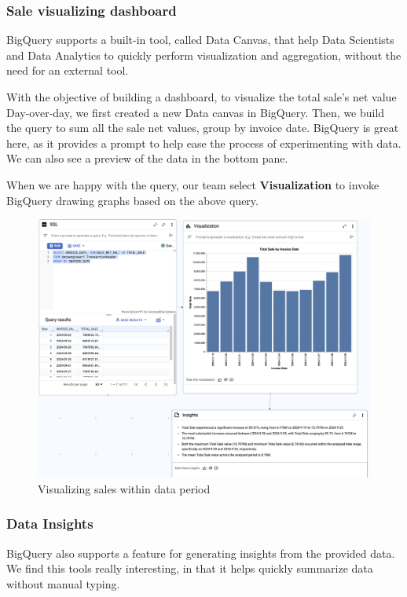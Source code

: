 \subsubsection{Sale visualizing dashboard}
BigQuery supports a built-in tool, called Data Canvas, that help Data Scientists and Data Analytics
to quickly perform visualization and aggregation, without the need for an external tool.

With the objective of building a dashboard, to visualize the total sale's net value Day-over-day, we
first created a new Data canvas in BigQuery. Then, we build the query to sum all the sale net
values, group by invoice date. BigQuery is great here, as it provides a prompt to help ease the
process of experimenting with data. We can also see a preview of the data in the bottom pane.

When we are happy with the query, our team select \textbf{Visualization} to invoke BigQuery drawing
graphs based on the above query.

\begin{figure}[htp]
    \centering
    \includegraphics[width=\linewidth]{images/data_canvas.png}
    \caption{Visualizing sales within data period}
\end{figure}

\subsubsection{Data Insights}
BigQuery also supports a feature for generating insights from the provided data. We find this tools
really interesting, in that it helps quickly summarize data without manual typing.

